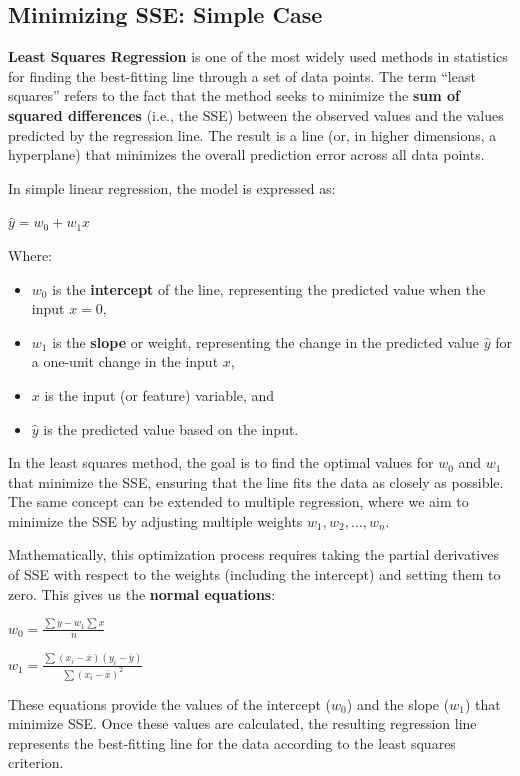 \subsection{Minimizing SSE: Simple Case}
\begin{flushleft}
    \large \textbf{Least Squares Regression} is one of the most widely used methods in statistics for finding the best-fitting line through a set of data points. The term “least squares” refers to the fact that the method seeks to minimize the \textbf{sum of squared differences} (i.e., the SSE) between the observed values and the values predicted by the regression line. The result is a line (or, in higher dimensions, a hyperplane) that minimizes the overall prediction error across all data points.

    In simple linear regression, the model is expressed as:
    \begin{center}
        \( \hat{y} = w_0 + w_1x \)
    \end{center}
    Where:
    \begin{itemize}
        \item \( w_0 \) is the \textbf{intercept} of the line, representing the predicted value when the input \( x = 0 \),
        \item \( w_1 \) is the \textbf{slope} or weight, representing the change in the predicted value \( \hat{y} \) for a one-unit change in the input \( x \),
        \item \( x \) is the input (or feature) variable, and
        \item \( \hat{y} \) is the predicted value based on the input.
    \end{itemize}

    In the least squares method, the goal is to find the optimal values for \( w_0 \) and \( w_1 \) that minimize the SSE, ensuring that the line fits the data as closely as possible. The same concept can be extended to multiple regression, where we aim to minimize the SSE by adjusting multiple weights \( w_1, w_2, ..., w_n \).

    Mathematically, this optimization process requires taking the partial derivatives of SSE with respect to the weights (including the intercept) and setting them to zero. This gives us the \textbf{normal equations}:
    \begin{center}
        \( w_0 = \frac{\sum y - w_1\sum x}{n} \)
    \end{center}
    \begin{center}
        \( w_1 = \frac{\sum(x_i - \bar{x})(y_i - \bar{y})}{\sum(x_i - \bar{x})^2} \)
    \end{center}

    These equations provide the values of the intercept (\( w_0 \)) and the slope (\( w_1 \)) that minimize SSE. Once these values are calculated, the resulting regression line represents the best-fitting line for the data according to the least squares criterion.
\end{flushleft}
